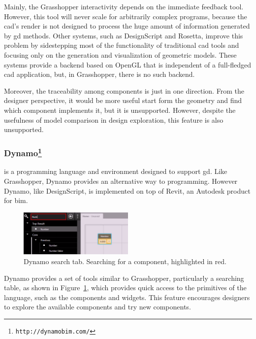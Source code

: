 Mainly, the Grasshopper interactivity depends on the immediate feedback tool. However, this tool will never scale for arbitrarily complex programs, because the \ac{cad}'s render is not designed to process the huge amount of information generated by \ac{gd} methods. Other systems, such as DesignScript and Rosetta, improve this problem by sidestepping most of the functionality of traditional \ac{cad} tools and focusing only on the generation and visualization of geometric models. These systems provide a backend based on OpenGL that is independent of a full-fledged \ac{cad} application, but, in Grasshopper, there is no such backend.

Moreover, the traceability among components is just in one direction. From the designer perspective, it would be more useful start form the geometry and find which component implements it, but it is unsupported. However, despite the usefulness of model comparison in design exploration, this feature is also unsupported.
\subsubsection{Dynamo\protect\footnote{\texttt{http://dynamobim.com/}}} is a programming language and environment designed to support \ac{gd}. Like Grasshopper, Dynamo provides an alternative way to programming. However Dynamo, like DesignScript, is implemented on top of Revit, an Autodesk product for \ac{bim}.

\begin{figure}
  \vspace{-30pt}
  \begin{center}
    \includegraphics[width=0.5\textwidth]{img/dynam-tab}
  \end{center}
  \vspace{-20pt}
 \caption{Dynamo search tab. Searching for a component, highlighted in red.}  
  \vspace{-15pt}
    \label{fig:dynam}
\end{figure}

Dynamo provides a set of tools similar to Grasshopper, particularly a searching table, as shown in Figure~\ref{fig:dynam}, which provides quick access to the primitives of the language, such as the components and widgets. This feature encourages designers to explore the available components and try new components.

